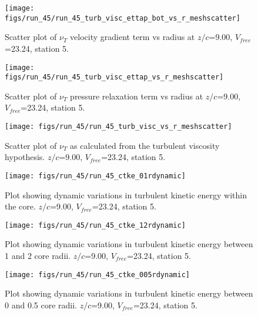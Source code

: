 \begin{figure}[H]
\centering
\texttt{[image: figs/run\_45/run\_45\_turb\_visc\_ettap\_bot\_vs\_r\_meshscatter]}
\caption{Scatter plot of $\nu_T$ velocity gradient term vs radius at $z/c$=9.00, $V_{free}$=23.24, station 5.}
\end{figure}


\begin{figure}[H]
\centering
\texttt{[image: figs/run\_45/run\_45\_turb\_visc\_ettap\_vs\_r\_meshscatter]}
\caption{Scatter plot of $\nu_T$ pressure relaxation term vs radius at $z/c$=9.00, $V_{free}$=23.24, station 5.}
\end{figure}


\begin{figure}[H]
\centering
\texttt{[image: figs/run\_45/run\_45\_turb\_visc\_vs\_r\_meshscatter]}
\caption{Scatter plot of $\nu_T$ as calculated from the turbulent viscosity hypothesis. $z/c$=9.00, $V_{free}$=23.24, station 5.}
\end{figure}


\begin{figure}[H]
\centering
\texttt{[image: figs/run\_45/run\_45\_ctke\_01rdynamic]}
\caption{Plot showing dynamic variations in turbulent kinetic energy within the core. $z/c$=9.00, $V_{free}$=23.24, station 5.}
\end{figure}


\begin{figure}[H]
\centering
\texttt{[image: figs/run\_45/run\_45\_ctke\_12rdynamic]}
\caption{Plot showing dynamic variations in turbulent kinetic energy between 1 and 2 core radii. $z/c$=9.00, $V_{free}$=23.24, station 5.}
\end{figure}


\begin{figure}[H]
\centering
\texttt{[image: figs/run\_45/run\_45\_ctke\_005rdynamic]}
\caption{Plot showing dynamic variations in turbulent kinetic energy between 0 and 0.5 core radii. $z/c$=9.00, $V_{free}$=23.24, station 5.}
\end{figure}


